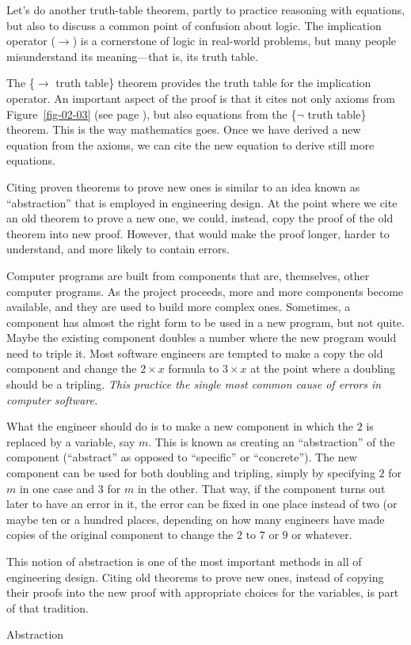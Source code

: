 Let's do another truth-table theorem, partly to practice
reasoning with equations, but also to discuss a common
point of confusion about logic. The implication operator
($\rightarrow$) is a cornerstone of logic in real-world problems,
but many people misunderstand its meaning---that is, its truth table.

The \{$\rightarrow$ truth table\} theorem provides the truth table for the implication operator. An important aspect of the proof is that it cites not only axioms from Figure~\ref{fig-02-03} (see page \pageref{fig-02-03}),
but also equations from the \{$\neg$ truth table\} theorem. This is the way mathematics goes. Once we have derived a new equation from the axioms, we can cite the new equation to derive still more equations.

\begin{aside}
 Citing proven theorems to prove new ones is similar to an idea known as ``abstraction'' that is employed in engineering design.
 At the point where we cite an old theorem to prove a new one, we could, instead, copy the proof of the old theorem into new proof. However, that would make the proof longer, harder to understand, and more likely to contain errors.

 Computer programs are built from components that are, themselves, other computer programs. As the project proceeds, more and more components become available, and they are used to build more complex ones. Sometimes, a component has almost the right form to be used in a new program, but not quite. Maybe the existing component doubles a number where the new program would need to triple it. Most software engineers are tempted to make a copy the old component and change the $2 \times x$ formula to $3 \times x$ at the point where a doubling should be a tripling. \emph{This practice the single most common cause of errors in computer software.}

 What the engineer should do is to make a new component in which the $2$ is replaced by a variable, say $m$. This is known as creating an ``abstraction'' of the component (``abstract'' as opposed to ``specific'' or ``concrete''). The new component can be used for both doubling and tripling, simply by specifying $2$ for $m$ in one case and $3$ for $m$ in the other. That way, if the component turns out later to have an error in it, the error can be fixed in one place instead of two (or maybe ten or a hundred places, depending on how many engineers have made copies of the original component to change the $2$ to $7$ or $9$ or whatever.

 This notion of abstraction is one of the most important methods in all of engineering design. Citing old theorems to prove new ones, instead of copying their proofs into the new proof with appropriate choices for the variables, is part of that tradition.

\caption{Abstraction}
\label{abstraction}
\end{aside}

